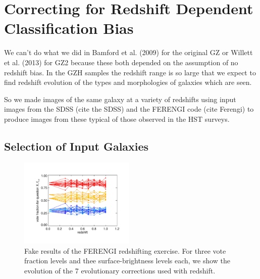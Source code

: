 \documentclass[usenatbib]{mn2e}
\begin{document}
\section{Correcting for Redshift Dependent Classification Bias}

We can't do what we did in Bamford et al. (2009) for the original GZ or Willett et al. (2013) for GZ2 because these both depended on the assumption of no redshift bias. In the GZH samples the redshift range is so large that we expect to find redshift evolution of the types and morphologies of galaxies which are seen. 

So we made images of the same galaxy at a variety of redshifts using input images from the SDSS (cite the SDSS) and the FERENGI code (cite Ferengi) to produce images from these typical of those observed in the HST surveys. 
 
\subsection{Selection of Input Galaxies}


\begin{figure}
\begin{center}

\includegraphics[width=0.49\textwidth]{fake_results.pdf}

\caption{Fake results of the FERENGI redshifting exercise. For three vote fraction levels and thee surface-brightness levels each, we show the evolution of the 7 evolutionary corrections used with redshift.}

\label{fig:ferengi_results_fake}

\end{center}
\end{figure}
\end{document}
